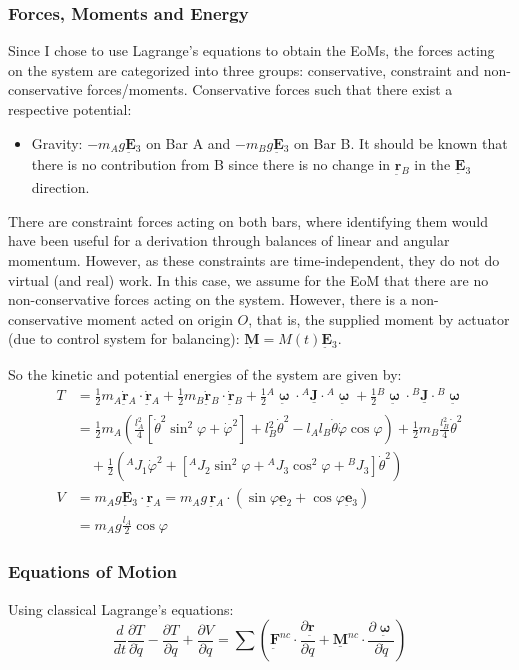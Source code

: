 \documentclass[12pt]{article}
\newcommand{\vb}[1]{{\underset{\tilde{}}{\mathbf{#1}}}}
\newcommand{\mb}[1]{\underline{\mathbf{#1}}}
\newcommand{\bomega}{\vb{\boldsymbol{\upomega}}}
\begin{document}
\subsubsection{Forces, Moments and Energy}
Since I chose to use Lagrange's equations to obtain the EoMs, the forces acting on the system are categorized into three groups: conservative, constraint and non-conservative forces/moments.
Conservative forces such that there exist a respective potential:
\begin{itemize}
    \item Gravity: $-m_A g \vb{E}{}_3$ on Bar A and $-m_B g \vb{E}{}_3$ on Bar B. It should be known that there is no contribution from B since there is no change in $\vb{r}{}_B$ in the $\vb{E}{}_3$ direction.
\end{itemize}
There are constraint forces acting on both bars, where identifying them would have been useful for a derivation through balances of linear and angular momentum. However, as these constraints are time-independent, they do not do virtual (and real) work. In this case, we assume for the EoM that there are no non-conservative forces acting on the system. However, there is a non-conservative moment acted on origin $O$, that is, the supplied moment by actuator (due to control system for balancing): \(\vb{M} = M(t)\vb{E}{}_3 \).

So the kinetic and potential energies of the system are given by:
\begin{align*}
    T &= \frac{1}{2}m{}_A \dot{\vb{r}}{}_A \cdot \dot{\vb{r}}{}_A + \frac{1}{2}m{}_B \dot{\vb{r}}{}_B \cdot \dot{\vb{r}}{}_B + \frac{1}{2} {}^A\bomega \cdot {}^A\mb{J} \cdot {}^A\bomega + \frac{1}{2} {}^B\bomega \cdot {}^B\mb{J} \cdot {}^B\bomega \\
      &= \frac{1}{2}m{}_A \left( \frac{l{}_A^2}{4} [\dot{\theta}^2\sin^2\varphi + \dot{\varphi}^2] + l{}_B^2\dot{\theta}^2 - l{}_A l{}_B \dot{\theta}\dot{\varphi}\cos\varphi \right) + \frac{1}{2}m{}_B \frac{l{}_B^2}{4} \dot{\theta}^2 \\
      &\quad + \frac{1}{2}\left( {}^A J{}_1 \dot{\varphi}^2 + \left[ {}^A J{}_2 \sin^2\varphi + {}^A J{}_3 \cos^2\varphi + {}^B J{}_3 \right] \dot{\theta}^2 \right) \\
    V &= m{}_A g \vb{E}{}_3 \cdot \vb{r}{}_A = m{}_A g \, \vb{r}{}_A \cdot (\sin\varphi \vb{e}{}_2 + \cos\varphi \vb{e}{}_3) \\
      &= m{}_A g \frac{l{}_A}{2} \cos\varphi
\end{align*}

\subsubsection{Equations of Motion}
Using classical Lagrange's equations:
\[ \frac{d}{dt} \frac{\partial T}{\partial \dot{q}} - \frac{\partial T}{\partial q} + \frac{\partial V}{\partial q} = \sum \left( \vb{F}^{nc} \cdot \frac{\partial \vb{r}}{\partial q} + \mb{M}^{nc} \cdot \frac{\partial \bomega}{\partial \dot{q}} \right) \]
\end{document}

